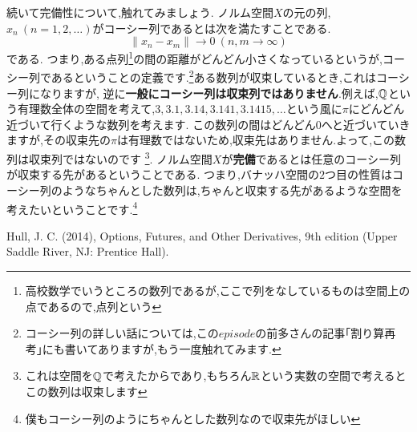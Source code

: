 続いて完備性について,触れてみましょう.
ノルム空間$X$の元の列,$x_n \ (n=1,2,\dotsc)$がコーシー列であるとは次を満たすことである.
\[
\| x_n - x_m \| \to 0 \ (n,m \to \infty)
\]
である.
つまり,ある点列\footnote{高校数学でいうところの数列であるが,ここで列をなしているものは空間上の点であるので,点列という}の間の距離がどんどん小さくなっているというが,コーシー列であるということの定義です.\footnote{コーシー列の詳しい話については,この$episode$の前多さんの記事｢割り算再考｣にも書いてありますが,もう一度触れてみます.}ある数列が収束しているとき,これはコーシー列になりますが,
逆に{\bf 一般にコーシー列は収束列ではありません}.例えば,$\mathbb Q$という有理数全体の空間を考えて,$3,3.1,3.14,3.141,3.1415,\dotsc$という風に$\pi$にどんどん近づいて行くような数列を考えます.
この数列の間はどんどん$0$へと近づいていきますが,その収束先の$\pi$は有理数ではないため,収束先はありません.よって,この数列は収束列ではないのです
\footnote{これは空間を$\mathbb Q$で考えたからであり,もちろん$\mathbb R$という実数の空間で考えるとこの数列は収束します}.
ノルム空間$X$が{\bf 完備}であるとは任意のコーシー列が収束する先があるということである.
つまり,バナッハ空間の$2$つ目の性質はコーシー列のようなちゃんとした数列は,ちゃんと収束する先があるような空間を考えたいということです.\footnote{僕もコーシー列のようにちゃんとした数列なので収束先がほしい}
\begin{thebibliography}{9}
\item Hull, J. C. (2014), Options, Futures, and Other Derivatives, 9th edition (Upper Saddle River, NJ: Prentice Hall).
\end{thebibliography}
